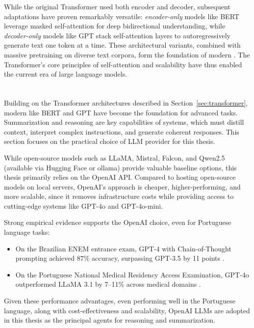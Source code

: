 While the original Transformer used both encoder and decoder, subsequent adaptations have proven remarkably versatile: \textit{encoder-only} models like \gls{BERT} leverage masked self-attention for deep bidirectional understanding, while \textit{decoder-only} models like \gls{GPT} stack self-attention layers to autoregressively generate text one token at a time. These architectural variants, combined with massive pretraining on diverse text corpora, form the foundation of modern . The Transformer's core principles of self-attention and scalability have thus enabled the current era of large language models.

\section{}
\label{sec:llm}
Building on the Transformer architectures described in Section~\ref{sec:transformer}, modern  like \gls{BERT} and \gls{GPT} have become the foundation for advanced  tasks. Summarization and reasoning are key capabilities of  systems, which must distill context, interpret complex instructions, and generate coherent responses. This section focuses on the practical choice of \gls{LLM} provider for this thesis.

While open-source models such as LLaMA, Mistral, Falcon, and Qwen2.5 (available via Hugging Face or ollama) provide valuable baseline options, this thesis primarily relies on the OpenAI API. Compared to hosting open-source models on local servers, OpenAI's approach is cheaper, higher-performing, and more scalable, since it removes infrastructure costs while providing access to cutting-edge systems like \gls{GPT}-4o and \gls{GPT}-4o-mini.

Strong empirical evidence supports the OpenAI choice, even for Portuguese language tasks:
\begin{itemize}
  \item On the Brazilian ENEM entrance exam, \gls{GPT}-4 with Chain-of-Thought prompting achieved 87\% accuracy, surpassing \gls{GPT}-3.5 by 11 points \cite{arxiv2303.17003}.
  \item On the Portuguese National Medical Residency Access Examination, \gls{GPT}-4o outperformed LLaMA 3.1 by 7–11\% across medical domains \cite{pmc12166901}.
\end{itemize}

Given these performance advantages, even performing well in the Portuguese language, along with cost-effectiveness and scalability, OpenAI \glspl{LLM} are adopted in this thesis as the principal agents for reasoning and summarization.



